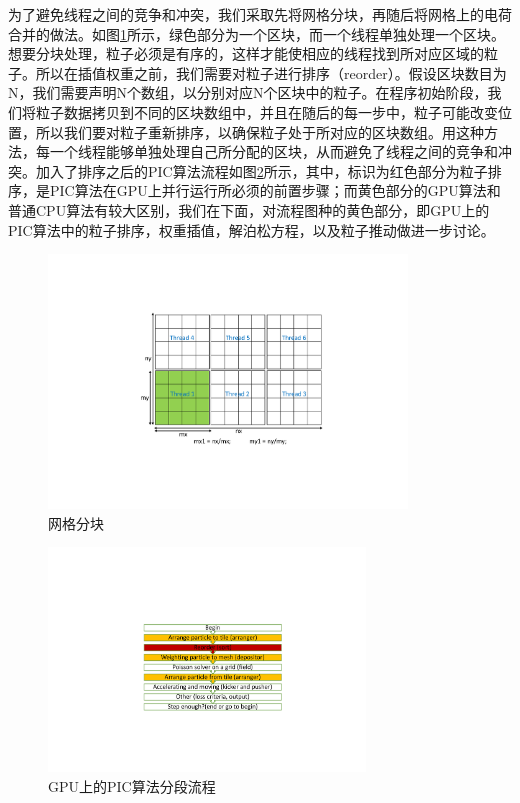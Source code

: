 为了避免线程之间的竞争和冲突，我们采取先将网格分块，再随后将网格上的电荷合并的做法。如图\ref{fig:PIC_tile}所示，绿色部分为一个区块，而一个线程单独处理一个区块。想要分块处理，粒子必须是有序的，这样才能使相应的线程找到所对应区域的粒子。所以在插值权重之前，我们需要对粒子进行排序（reorder）。假设区块数目为N，我们需要声明N个数组，以分别对应N个区块中的粒子。在程序初始阶段，我们将粒子数据拷贝到不同的区块数组中，并且在随后的每一步中，粒子可能改变位置，所以我们要对粒子重新排序，以确保粒子处于所对应的区块数组。用这种方法，每一个线程能够单独处理自己所分配的区块，从而避免了线程之间的竞争和冲突。加入了排序之后的PIC算法流程如图\ref{fig:PIC_flow_reorder}所示，其中，标识为红色部分为粒子排序，是PIC算法在GPU上并行运行所必须的前置步骤；而黄色部分的GPU算法和普通CPU算法有较大区别，我们在下面，对流程图种的黄色部分，即GPU上的PIC算法中的粒子排序，权重插值，解泊松方程，以及粒子推动做进一步讨论。

\begin{figure}[!htb]
    \centering
    \includegraphics[width=0.85\textwidth]{Img/3PIC_tile.pdf}
    \caption{网格分块}
    \label{fig:PIC_tile}
\end{figure}

\begin{figure}[!htb]
    \centering
    \includegraphics[width=0.75\textwidth]{Img/3PIC_flow_reorder.pdf}
    \caption{GPU上的PIC算法分段流程}
    \label{fig:PIC_flow_reorder}
\end{figure}




